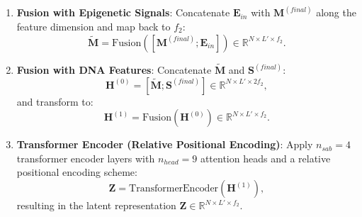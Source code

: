 \documentclass[a4paper, 11pt]{article}
\begin{document}
\begin{enumerate}
    \item \textbf{Fusion with Epigenetic Signals}:
    Concatenate $\mathbf{E}_{in}$ with $\mathbf{M}^{(final)}$ along the feature dimension and map back to $f_2$:
    \[
    \tilde{\mathbf{M}} = \text{Fusion}([\mathbf{M}^{(final)};\mathbf{E}_{in}]) \in \mathbb{R}^{N \times L' \times f_2}.
    \]

\item \textbf{Fusion with DNA Features}:
    Concatenate $\tilde{\mathbf{M}}$ and $\mathbf{S}^{(final)}$:
    \[
    \mathbf{H}^{(0)} = [\tilde{\mathbf{M}}; \mathbf{S}^{(final)}] \in \mathbb{R}^{N \times L' \times 2f_2},
    \]
    and transform to:
    \[
    \mathbf{H}^{(1)} = \text{Fusion}(\mathbf{H}^{(0)}) \in \mathbb{R}^{N \times L' \times f_2}.
    \]

\item \textbf{Transformer Encoder (Relative Positional Encoding)}:
    Apply $n_{sab}=4$ transformer encoder layers with $n_{head}=9$ attention heads and a relative positional encoding scheme:
    \[
    \mathbf{Z} = \text{TransformerEncoder}(\mathbf{H}^{(1)}),
    \]
    resulting in the latent representation $\mathbf{Z} \in \mathbb{R}^{N \times L' \times f_2}$.
\end{enumerate}
\end{document}
